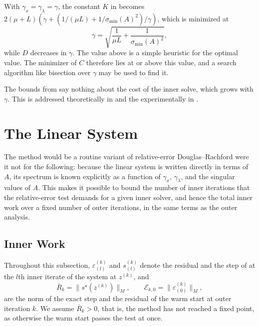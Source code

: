 \documentclass[11pt]{article}
\begin{document}
\begin{remark}\label{rem:step-size}
    With $\gamma_x = \gamma_\lambda = \gamma$, the constant $K$ in  becomes $2(\mu + L)\left(\gamma + (1/(\mu L) + 1/\sigma_{\min}(A)^2)/\gamma\right)$, which is minimized at
    \begin{equation*}
        \gamma = \sqrt{\frac{1}{\mu L} + \frac{1}{\sigma_{\min}(A)^2}},
    \end{equation*}
    while $D$ decreases in $\gamma$.
    The value above is a simple heuristic for the optimal value.
    The minimizer of $C$ therefore lies at or above this value, and a search algorithm like bisection over $\gamma$ may be used to find it.
\end{remark}
\begin{remark}
    The bounds from  say nothing about the cost of the inner solve, which grows with $\gamma$.
    This is addressed theoretically in  and the experimentally in .
\end{remark}

\section{The Linear System}\label{sec:linear-system}
The method would be a routine variant of relative-error Douglas--Rachford were it not for the following: because the linear system  is written directly in terms of $A$, its spectrum is known explicitly as a function of $\gamma_x$, $\gamma_\lambda$, and the singular values of $A$.
This makes it possible to bound the number of inner iterations that the relative-error test demands for a given inner solver, and hence the total inner work over a fixed number of outer iterations, in the same terms as the outer analysis.

\subsection{Inner Work}
Throughout this subsection, $\varepsilon^{(k)}_{(l)}$ and $s^{(k)}_{(l)}$ denote the residual and the step of  at the $l$th inner iterate of the system at $z^{(k)}$, and
\begin{equation*}
    \bar{R}_k = \|s^\star(z^{(k)})\|_M, \qquad \mathcal{E}_{k,0} = \|\varepsilon^{(k)}_{(0)}\|_M,
\end{equation*}
are the norm of the exact step and the residual of the warm start at outer iteration $k$.
We assume $\bar R_k > 0$, that is, the method has not reached a fixed point, as otherwise the warm start passes the test at once.
\end{document}
